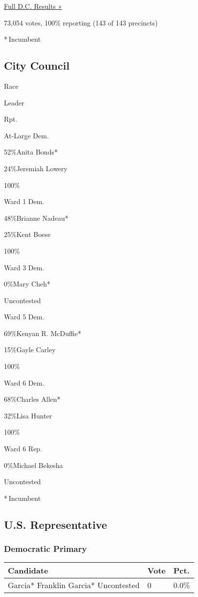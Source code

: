\href{https://www.nytimes3xbfgragh.onion/elections/results/district-of-columbia}{Full
D.C. Results »}

73,054 votes, 100\% reporting (143 of 143 precincts)

* Incumbent

\hypertarget{city-council}{%
\subsection{City Council}\label{city-council}}

Race

Leader

Rpt.

At-Large Dem.

 52\%Anita Bonds*

 24\%Jeremiah Lowery

100\%

Ward 1 Dem.

 48\%Brianne Nadeau*

 25\%Kent Boese

100\%

Ward 3 Dem.

 0\%Mary Cheh*

Uncontested

Ward 5 Dem.

 69\%Kenyan R. McDuffie*

 15\%Gayle Carley

100\%

Ward 6 Dem.

 68\%Charles Allen*

 32\%Lisa Hunter

100\%

Ward 6 Rep.

 0\%Michael Bekesha

Uncontested

* Incumbent~

\hypertarget{us-representative}{%
\subsection{U.S. Representative}\label{us-representative}}

\hypertarget{democratic-primary-2}{%
\subsubsection{Democratic Primary}\label{democratic-primary-2}}

\begin{longtable}[]{@{}lll@{}}
\toprule
Candidate & Vote & Pct.\tabularnewline
\midrule
\endhead
 Garcia* Franklin Garcia* Uncontested & 0 & 0.0\%\tabularnewline
\bottomrule
\end{longtable}

